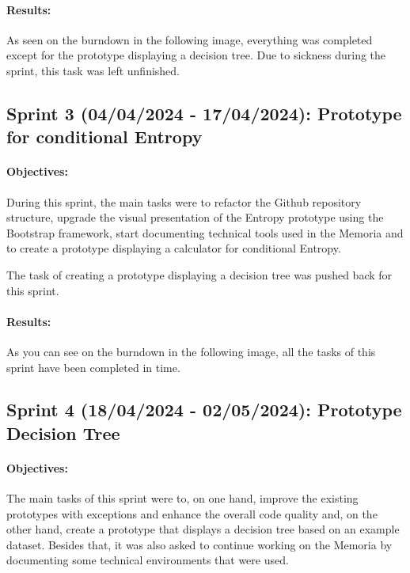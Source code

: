 \paragraph{Results:}
As seen on the burndown in the following image, everything was completed except for the prototype displaying a decision tree. Due to sickness during the sprint, this task was left unfinished.


\subsection{Sprint 3 (04/04/2024 - 17/04/2024): Prototype for conditional Entropy}
\paragraph{Objectives:}
During this sprint, the main tasks were to refactor the Github repository structure, upgrade the visual presentation of the Entropy prototype using the Bootstrap framework, start documenting technical tools used in the Memoria and to create a prototype displaying a calculator for conditional Entropy.

The task of creating a prototype displaying a decision tree was pushed back for this sprint.

\paragraph{Results:}
As you can see on the burndown in the following image, all the tasks of this sprint have been completed in time.


\subsection{Sprint 4 (18/04/2024 - 02/05/2024): Prototype Decision Tree}
\paragraph{Objectives:}
The main tasks of this sprint were to, on one hand, improve the existing prototypes with exceptions and enhance the overall code quality and, on the other hand, create a prototype that displays a decision tree based on an example dataset. Besides that, it was also asked to continue working on the Memoria by documenting some technical environments that were used.

